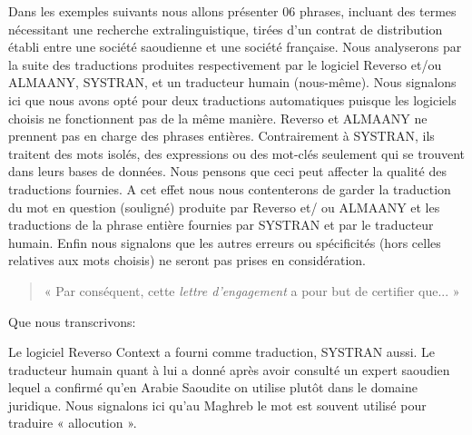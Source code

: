 \documentclass[french]{textolivre}
\begin{document}
Dans les exemples suivants nous allons présenter 06 phrases, incluant des termes nécessitant une recherche extralinguistique, tirées d’un contrat de distribution établi entre une société saoudienne et une société française. Nous analyserons par la suite des traductions produites respectivement par le logiciel Reverso et/ou ALMAANY, SYSTRAN, et un traducteur humain (nous-même). Nous signalons ici que nous avons opté pour deux traductions automatiques puisque les logiciels choisis ne fonctionnent pas de la même manière. Reverso et ALMAANY ne prennent pas en charge des phrases entières. Contrairement à SYSTRAN, ils traitent des mots isolés, des expressions ou des mot-clés seulement qui se trouvent dans leurs bases de données. Nous pensons que ceci peut affecter la qualité des traductions fournies. A cet effet nous nous contenterons de garder la traduction du mot en question (souligné) produite par Reverso et/ ou ALMAANY et les traductions de la phrase entière fournies par SYSTRAN et par le traducteur humain. Enfin nous signalons que les autres erreurs ou spécificités (hors celles relatives aux mots choisis) ne seront pas prises en considération.

\begin{quote}
« Par conséquent, cette \emph{lettre d’engagement} a pour but de certifier que... »    
\end{quote}


\begin{quote}
\end{quote}

Que nous transcrivons:

\begin{quote}
\end{quote}

Le logiciel Reverso Context a fourni  comme traduction, SYSTRAN aussi. Le traducteur humain quant à lui a donné  après avoir consulté un expert saoudien lequel a confirmé qu’en Arabie Saoudite on utilise plutôt  dans le domaine juridique. Nous signalons ici qu’au Maghreb le mot  est souvent utilisé pour traduire « allocution ».
\end{document}
